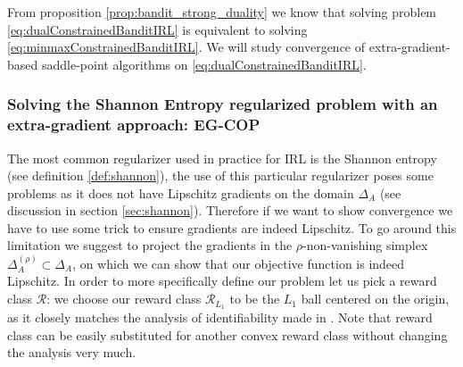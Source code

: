 \noindent
From proposition \ref{prop:bandit_strong_duality} we know that solving problem \ref{eq:dualConstrainedBanditIRL} is equivalent to solving \ref{eq:minmaxConstrainedBanditIRL}. We will study convergence of extra-gradient-based saddle-point algorithms on \ref{eq:dualConstrainedBanditIRL}. \\%

\subsubsection{Solving the Shannon Entropy regularized problem with an extra-gradient approach: EG-COP}


The most common regularizer used in practice for IRL is the Shannon entropy (see definition \ref{def:shannon}), the use of this particular regularizer poses some problems as it does not have Lipschitz gradients on the domain $\Delta_A$ (see discussion in section \ref{sec:shannon}). Therefore if we want to show convergence we have to use some trick to ensure gradients are indeed Lipschitz. To go around this limitation we suggest to project the gradients in the $\rho$-non-vanishing simplex $\Delta^{(\rho)}_A \subset \Delta_A$, on which we can show that our objective function is indeed Lipschitz. In order to more specifically define our problem let us pick a reward class $\mathcal{R}$: we choose our reward class $\mathcal{R}_{L_1}$ to be the $L_1$ ball centered on the origin, as it closely matches the analysis of identifiability made in \cite{Schlaginhaufen2023}. Note that reward class can be easily substituted for another convex reward class without changing the analysis very much. \\


